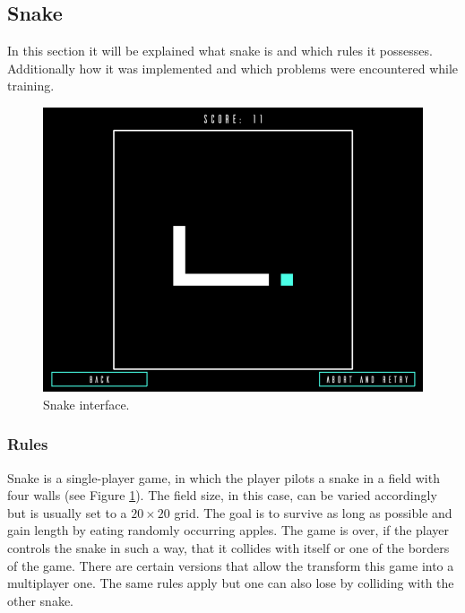 \documentclass[12pt]{article}
\begin{document}
\subsection{Snake}
In this section it will be explained what snake is and which rules it possesses. Additionally how it was implemented and which problems were encountered while training.
\begin{figure}[ht]
    \centering
    \includegraphics[width=0.9\linewidth]{pictures/Snake.png}
    \caption{Snake interface.}
    \label{fig:snake}
\end{figure}
\subsubsection{Rules}
Snake is a single-player game, in which the player pilots a snake in a field with four walls (see Figure \ref{fig:snake}). The field size, in this case, can be varied accordingly but is usually set to a $20{\times}20$ grid. The goal is to survive as long as possible and gain length by eating randomly occurring apples. The game is over, if the player controls the snake in such a way, that it collides with itself or one of the borders of the game. There are certain versions that allow the transform this game into a multiplayer one. The same rules apply but one can also lose by colliding with the other snake.
\end{document}
